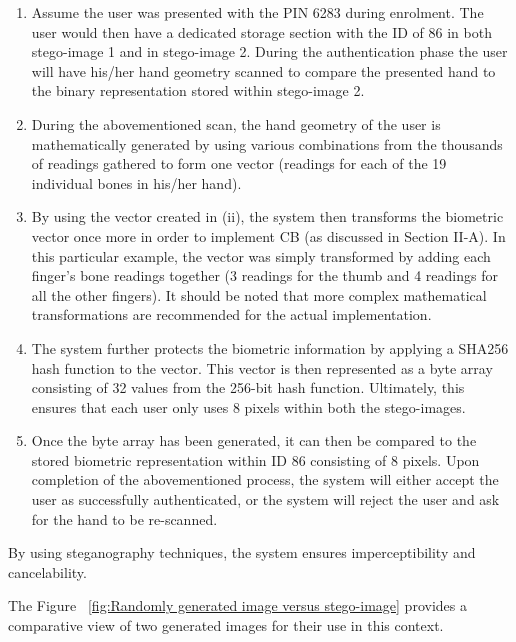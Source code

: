 \begin{enumerate}[label=\roman*.]
    
    \item  Assume the user was presented with the PIN 6283 during enrolment. The user would then have a dedicated storage section with the ID of 86 in both stego-image 1 and in stego-image 2. During the authentication phase the user will have his/her hand geometry scanned to compare the presented hand to the binary representation stored within stego-image 2. 
    
    \item  During the abovementioned scan, the hand geometry of the user is mathematically generated by using various combinations from the thousands of readings gathered to form one vector (readings for each of the 19 individual bones in his/her hand).
    
    \item By using the vector created in (ii), the system then transforms the biometric vector once more in order to implement CB (as discussed in Section II-A). In this particular example, the vector was simply transformed by adding each finger’s bone readings together (3 readings for the thumb and 4 readings for all the other fingers). It should be noted that more complex mathematical transformations are recommended for the actual implementation.
    
    \item The system further protects the biometric information by applying a SHA256 hash function to the vector. This vector is then represented as a byte array consisting of 32 values from the 256-bit hash function. Ultimately, this ensures that each user only uses 8 pixels within both the stego-images.
    
    \item Once the byte array has been generated, it can then be compared to the stored biometric representation within ID 86 consisting of 8 pixels.
Upon completion of the abovementioned process, the system will either accept the user as successfully authenticated, or the system will reject the user and ask for the hand to be re-scanned.

\end{enumerate}

By using steganography techniques, the system ensures imperceptibility and cancelability.

The Figure ~\ref{fig:Randomly generated image versus stego-image} provides a comparative view of two generated images for their use in this context. 

